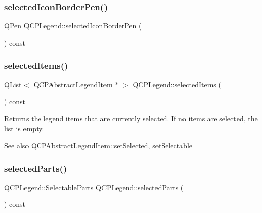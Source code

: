 \subsubsection{\texorpdfstring{selectedIconBorderPen()}{selectedIconBorderPen()}}
{\footnotesize\ttfamily Q\+Pen Q\+C\+P\+Legend\+::selected\+Icon\+Border\+Pen (\begin{DoxyParamCaption}{ }\end{DoxyParamCaption}) const\hspace{0.3cm}{\ttfamily [inline]}}

\mbox{\label{class_q_c_p_legend_ac7d9e567d5c551e09cd9bcc4306c5532}} 
\subsubsection{\texorpdfstring{selectedItems()}{selectedItems()}}
{\footnotesize\ttfamily Q\+List$<$ \mbox{\hyperlink{class_q_c_p_abstract_legend_item}{Q\+C\+P\+Abstract\+Legend\+Item}} $\ast$ $>$ Q\+C\+P\+Legend\+::selected\+Items (\begin{DoxyParamCaption}{ }\end{DoxyParamCaption}) const}

Returns the legend items that are currently selected. If no items are selected, the list is empty.

\begin{DoxySeeAlso}{See also}
\mbox{\hyperlink{class_q_c_p_abstract_legend_item_a6eed93b0ab99cb3eabb043fb08179c2b}{Q\+C\+P\+Abstract\+Legend\+Item\+::set\+Selected}}, set\+Selectable 
\end{DoxySeeAlso}
\mbox{\label{class_q_c_p_legend_a3efbf879f6936ec337690985e567dc6f}} 
\subsubsection{\texorpdfstring{selectedParts()}{selectedParts()}}
{\footnotesize\ttfamily Q\+C\+P\+Legend\+::\+Selectable\+Parts Q\+C\+P\+Legend\+::selected\+Parts (\begin{DoxyParamCaption}{ }\end{DoxyParamCaption}) const}

\mbox{\label{class_q_c_p_legend_ab9b469b27787bfb2ce6c8978a31821af}} 
